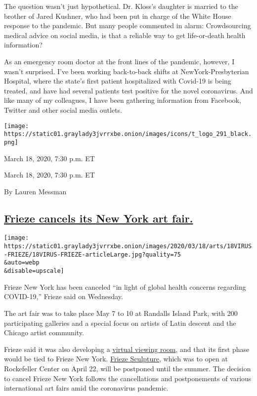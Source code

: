 The question wasn't just hypothetical. Dr. Kloss's daughter is married
to the brother of Jared Kushner, who had been put in charge of the White
House response to the pandemic. But many people commented in alarm:
Crowdsourcing medical advice on social media, is that a reliable way to
get life-or-death health information?

As an emergency room doctor at the front lines of the pandemic, however,
I wasn't surprised. I've been working back-to-back shifts at
NewYork-Presbyterian Hospital, where the state's first patient
hospitalized with Covid-19 is being treated, and have had several
patients test positive for the novel coronavirus. And like many of my
colleagues, I have been gathering information from Facebook, Twitter and
other social media outlets.

\texttt{[image: https://static01.graylady3jvrrxbe.onion/images/icons/t\_logo\_291\_black.png]}

March 18, 2020, 7:30 p.m. ET

March 18, 2020, 7:30 p.m. ET

By Lauren Messman

\hypertarget{frieze-cancels-its-new-york-art-fair}{%
\subsection{\texorpdfstring{\protect\hyperlink{frieze-cancels-its-new-york-art-fair}{Frieze
cancels its New York art
fair.}}{Frieze cancels its New York art fair.}}\label{frieze-cancels-its-new-york-art-fair}}

\texttt{[image: https://static01.graylady3jvrrxbe.onion/images/2020/03/18/arts/18VIRUS-FRIEZE/18VIRUS-FRIEZE-articleLarge.jpg?quality=75\\\&auto=webp\\\&disable=upscale]}

Frieze New York has been canceled ``in light of global health concerns
regarding COVID-19,'' Frieze said on Wednesday.

The art fair was to take place May 7 to 10 at Randalls Island Park, with
200 participating galleries and a special focus on artists of Latin
descent and the Chicago artist community.

Frieze said it was also developing a
\href{https://www.nytimes3xbfgragh.onion/2020/03/16/arts/design/art-galleries-online-viewing-coronavirus.html}{virtual
viewing room}, and that its first phase would be tied to Frieze New
York.
\href{https://www.nytimes3xbfgragh.onion/2019/05/01/arts/sculpture-frieze-new-york-.html}{Frieze
Sculpture}, which was to open at Rockefeller Center on April 22, will be
postponed until the summer. The decision to cancel Frieze New York
follows the cancellations and postponements of various international art
fairs amid the coronavirus pandemic.

